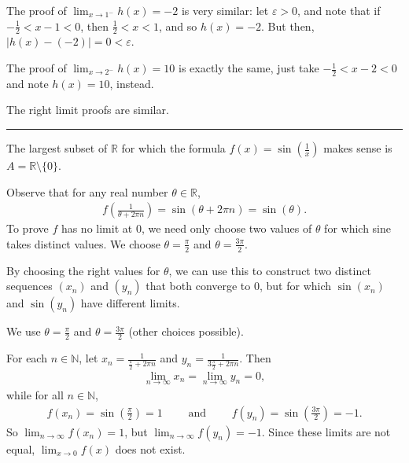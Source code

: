\documentclass[letterpaper,10pt,english]{jupyterBook}
\begin{document}
\sphinxAtStartPar
The proof of \(\lim_{x \rightarrow 1^-}h(x) = -2\) is very similar: let \(\varepsilon>0\), and note that if \(-\frac{1}{2}<x-1<0\), then \(\frac{1}{2}<x<1\), and so \(h(x)=-2\). But then, \(|h(x)-(-2)|=0<\varepsilon\).

\sphinxAtStartPar
The proof of \(\lim_{x \rightarrow 2^-}h(x) = 10\) is exactly the same, just take \(-\frac{1}{2}<x-2<0\) and note \(h(x)=10\), instead.

\sphinxAtStartPar
The right limit proofs are similar.


\bigskip\hrule\bigskip

\label{\detokenize{Solutions-upto46:id5}}
\sphinxAtStartPar
{\hyperref[\detokenize{Problems:id9}]{}}  The largest subset of \(\mathbb{R}\) for which the formula \(f(x)=\sin\left(\frac{1}{x}\right)\) makes sense is \(A = \mathbb{R} \setminus \{0\}\).

Observe that for any real number \(\theta\in\mathbb{R}\),
\begin{equation*}
\begin{split}
f\left(\frac{1}{\theta+2\pi n}\right) = \sin(\theta+2\pi n) = \sin(\theta).
\end{split}
\end{equation*}
\sphinxAtStartPar
To prove \(f\) has no limit at \(0\), we need only choose two values of \(\theta\) for which sine takes distinct values. We choose \(\theta=\frac{\pi}{2}\) and \(\theta=\frac{3\pi}{2}\).

By choosing the right values for \(\theta\), we can use this to construct two distinct sequences \((x_n)\) and \((y_n)\) that both converge to \(0\), but for which \(\sin(x_n)\) and \(\sin(y_n)\) have different limits.

We use \(\theta=\frac{\pi}{2}\) and \(\theta=\frac{3\pi}{2}\) (other choices possible).

For each \(n\in\mathbb{N}\), let \(x_n=\frac{1}{\frac{\pi}{2} + 2\pi n}\) and \(y_n=\frac{1}{3\frac{\pi}{2} + 2\pi n}\). Then
\begin{equation*}
\begin{split}
\lim_{n\rightarrow\infty} x_{n} =\lim_{n\rightarrow\infty} y_n= 0,
\end{split}
\end{equation*}
\sphinxAtStartPar
while for all \(n\in\mathbb{N}\),
\begin{equation*}
\begin{split}
f(x_n) = \sin\left(\frac{\pi}{2}\right) =1 \hspace{2em} \text{ and } \hspace{2em} f(y_n)=\sin\left(\frac{3\pi}{2}\right)=-1.
\end{split}
\end{equation*}
\sphinxAtStartPar
So \(\lim_{n\rightarrow\infty} f(x_{n}) = 1\), but \(\lim_{n\rightarrow\infty} f(y_n) = -1\). Since these limits are not equal, \(\lim_{x\to 0} f(x)\) does not exist.
\end{document}
